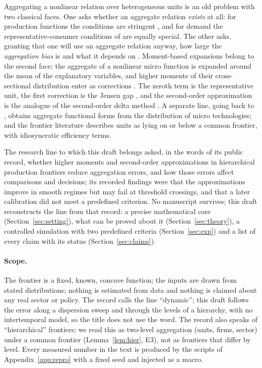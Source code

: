 \documentclass[10pt,a4paper]{article}
\theoremstyle{plain}
\theoremstyle{definition}
\theoremstyle{remark}
\begin{document}
Aggregating a nonlinear relation over heterogeneous units is an old problem with two classical faces. One asks whether an aggregate relation \emph{exists} at all: for production functions the conditions are stringent \citep{nataf1948,fisher1969,felipefisher2003}, and for demand the representative-consumer conditions of \citet{gorman1953} are equally special. The other asks, granting that one will use an aggregate relation anyway, how large the \emph{aggregation bias} is and what it depends on \citep{theil1954,stoker1984}. Moment-based expansions belong to the second face: the aggregate of a nonlinear micro function is expanded around the mean of the explanatory variables, and higher moments of their cross-sectional distribution enter as corrections \citep{lewbel1992,vangarderen2000}. The zeroth term is the representative unit, the first correction is the Jensen gap \citep{jensen1906}, and the second-order approximation is the analogue of the second-order delta method \citep{oehlert1992}. A separate line, going back to \citet{houthakker1955}, obtains aggregate functional forms from the distribution of micro technologies; and the frontier literature \citep{farrell1957,aigner1977} describes units as lying on or below a common frontier, with idiosyncratic efficiency terms.

The research line to which this draft belongs asked, in the words of its public record, whether higher moments and second-order approximations in hierarchical production frontiers reduce aggregation errors, and how those errors affect comparisons and decisions; its recorded findings were that the approximations improve in smooth regimes but may fail at threshold crossings, and that a later calibration did not meet a predefined criterion. No manuscript survives; this draft reconstructs the line from that record: a precise mathematical core (Section~\ref{sec:setting}), what can be proved about it (Section~\ref{sec:theory}), a controlled simulation with two predefined criteria (Section~\ref{sec:exp}) and a list of every claim with its status (Section~\ref{sec:claims}).

\paragraph{Scope.} The frontier is a fixed, known, concave function; the inputs are drawn from stated distributions; nothing is estimated from data and nothing is claimed about any real sector or policy. The record calls the line ``dynamic''; this draft follows the error along a dispersion sweep and through the levels of a hierarchy, with no intertemporal model, so the title does not use the word. The record also speaks of ``hierarchical'' frontiers; we read this as two-level aggregation (units, firms, sector) under a common frontier (Lemma~\ref{lem:hier}, E3), not as frontiers that differ by level. Every measured number in the text is produced by the scripts of Appendix~\ref{app:repro} with a fixed seed and injected as a macro.
\end{document}
